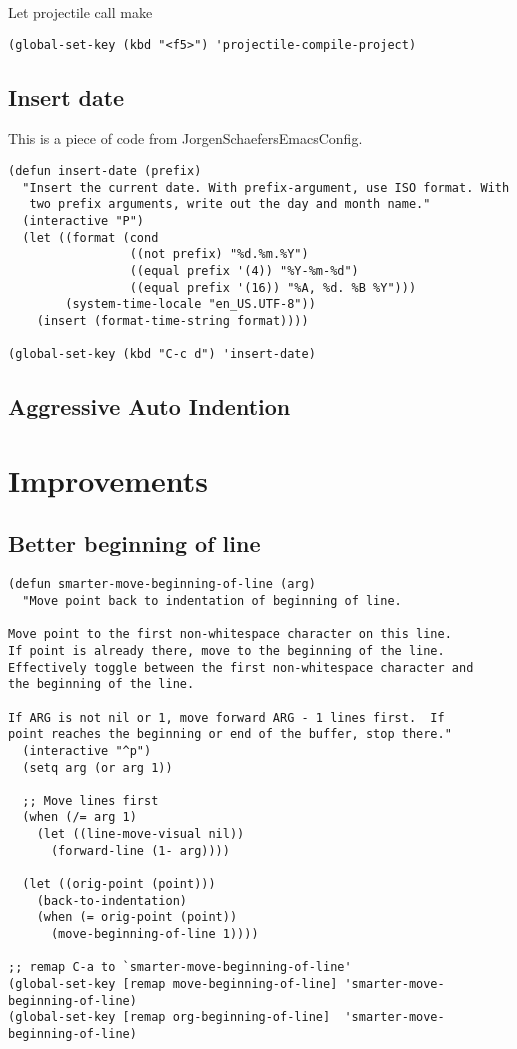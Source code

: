 \documentclass[12pt]{article}
\begin{document}
Let projectile call make

\begin{verbatim}
(global-set-key (kbd "<f5>") 'projectile-compile-project)
\end{verbatim}

\subsection{Insert date}
\label{sec:org82de222}
This is a piece of code from JorgenSchaefersEmacsConfig.
\begin{verbatim}
(defun insert-date (prefix)
  "Insert the current date. With prefix-argument, use ISO format. With
   two prefix arguments, write out the day and month name."
  (interactive "P")
  (let ((format (cond
                 ((not prefix) "%d.%m.%Y")
                 ((equal prefix '(4)) "%Y-%m-%d")
                 ((equal prefix '(16)) "%A, %d. %B %Y")))
        (system-time-locale "en_US.UTF-8"))
    (insert (format-time-string format))))

(global-set-key (kbd "C-c d") 'insert-date)
\end{verbatim}

\subsection{Aggressive Auto Indention}
\label{sec:orgb315f19}

\section{Improvements}
\label{sec:org38046b3}
\subsection{Better beginning of line}
\label{sec:org52825d4}

\begin{verbatim}
(defun smarter-move-beginning-of-line (arg)
  "Move point back to indentation of beginning of line.

Move point to the first non-whitespace character on this line.
If point is already there, move to the beginning of the line.
Effectively toggle between the first non-whitespace character and
the beginning of the line.

If ARG is not nil or 1, move forward ARG - 1 lines first.  If
point reaches the beginning or end of the buffer, stop there."
  (interactive "^p")
  (setq arg (or arg 1))

  ;; Move lines first
  (when (/= arg 1)
    (let ((line-move-visual nil))
      (forward-line (1- arg))))

  (let ((orig-point (point)))
    (back-to-indentation)
    (when (= orig-point (point))
      (move-beginning-of-line 1))))

;; remap C-a to `smarter-move-beginning-of-line'
(global-set-key [remap move-beginning-of-line] 'smarter-move-beginning-of-line)
(global-set-key [remap org-beginning-of-line]  'smarter-move-beginning-of-line)
\end{verbatim}
\end{document}
